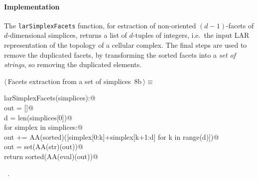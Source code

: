 \documentclass[11pt,oneside]{article}	%
\begin{document}
\paragraph{Implementation}

The \texttt{larSimplexFacets} function, for estraction of non-oriented $(d-1)$-facets of $d$-dimensional simplices, returns a list of $d$-tuples of integers, i.e.~the input LAR representation of the topology of a cellular complex. The final steps are used to remove the duplicated facets, by transforming the sorted facets into a \emph{set of strings}, so removing the duplicated elements.
        
\begin{flushleft} \small
\begin{minipage}{\linewidth} \label{scrap8}
\protect{}$\langle\,$Facets extraction from a set of simplices\nobreak\ {\footnotesize 8b}$\,\rangle\equiv$
\vspace{-1ex}
\begin{list}{}{} \item
\mbox{}\verb@def larSimplexFacets(simplices):@\\
\mbox{}\verb@    out = []@\\
\mbox{}\verb@    d = len(simplices[0])@\\
\mbox{}\verb@    for simplex in simplices:@\\
\mbox{}\verb@        out += AA(sorted)([simplex[0:k]+simplex[k+1:d] for k in range(d)])@\\
\mbox{}\verb@    out = set(AA(str)(out))@\\
\mbox{}\verb@    return  sorted(AA(eval)(out))@\\
\mbox{}\verb@@{\NWsep}
\end{list}
\vspace{-1ex}
\footnotesize\addtolength{\baselineskip}{-1ex}
\begin{list}{}{\setlength{\itemsep}{-\parsep}\setlength{\itemindent}{-\leftmargin}}
\item \NWtxtMacroRefIn\ .
\end{list}
\end{minipage}\\[4ex]
\end{flushleft}
\end{document}
